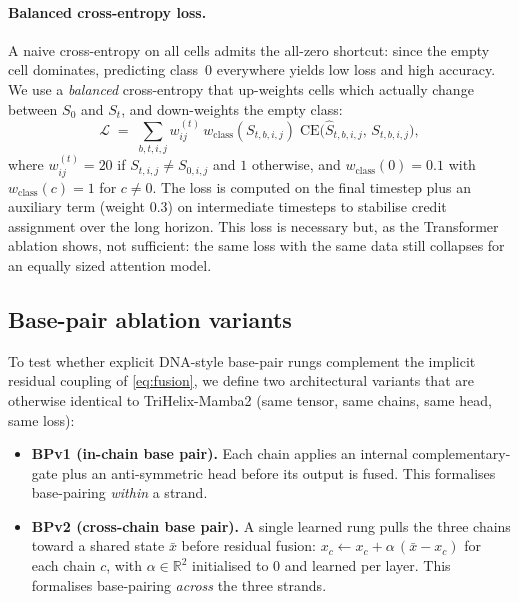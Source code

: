 \paragraph{Balanced cross-entropy loss.}
A naive cross-entropy on all cells admits the all-zero shortcut: since the
empty cell dominates, predicting class~0 everywhere yields low loss and high
accuracy. We use a \emph{balanced} cross-entropy that up-weights cells which
actually change between $S_0$ and $S_t$, and down-weights the empty class:
\begin{equation}
\mathcal{L} \;=\; \sum_{b,t,i,j} w_{ij}^{(t)}\,w_{\text{class}}(S_{t,b,i,j})\;
                  \mathrm{CE}\!\big(\hat{S}_{t,b,i,j},\, S_{t,b,i,j}\big),
\label{eq:loss}
\end{equation}
where $w_{ij}^{(t)}{=}20$ if $S_{t,i,j}\neq S_{0,i,j}$ and $1$ otherwise, and
$w_{\text{class}}(0){=}0.1$ with $w_{\text{class}}(c){=}1$ for $c\neq 0$. The
loss is computed on the final timestep plus an auxiliary term (weight $0.3$)
on intermediate timesteps to stabilise credit assignment over the long horizon.
This loss is necessary but, as the Transformer ablation shows, not sufficient:
the same loss with the same data still collapses for an equally sized
attention model.

\subsection{Base-pair ablation variants}
\label{sec:method-bp}

To test whether explicit DNA-style base-pair rungs complement the implicit
residual coupling of \cref{eq:fusion}, we define two architectural variants
that are otherwise identical to TriHelix-Mamba2 (same tensor, same chains, same
head, same loss):

\begin{itemize}[leftmargin=*,itemsep=2pt]
  \item \textbf{BPv1 (in-chain base pair).} Each chain applies an internal
        complementary-gate plus an anti-symmetric head before its output is
        fused. This formalises base-pairing \emph{within} a strand.
  \item \textbf{BPv2 (cross-chain base pair).} A single learned rung pulls the
        three chains toward a shared state $\bar{x}$ before residual fusion:
        $x_c \leftarrow x_c + \alpha\,(\bar{x} - x_c)$ for each chain $c$, with
        $\alpha\in\mathbb{R}^{2}$ initialised to $0$ and learned per layer.
        This formalises base-pairing \emph{across} the three strands.
\end{itemize}

